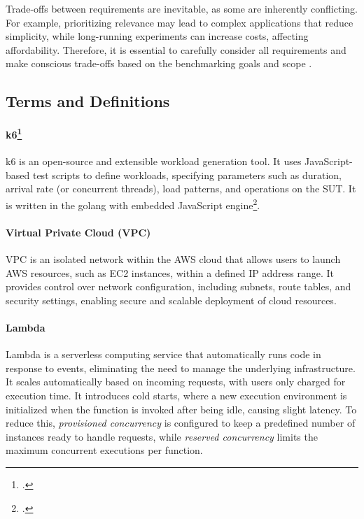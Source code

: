 Trade-offs between requirements are inevitable, as some are inherently conflicting. For example, prioritizing relevance may lead to complex applications that reduce simplicity, while long-running experiments can increase costs, affecting affordability. Therefore, it is essential to carefully consider all requirements and make conscious trade-offs based on the benchmarking goals and scope \cite{book_bermbach_cloud_service_benchmarking}.

\subsection{Terms and Definitions}
\label{challenges}

\paragraph{k6\footcite{https://k6.io/open-source/}}
k6 is an open-source and extensible workload generation tool. It uses JavaScript-based test scripts to define workloads, specifying parameters such as duration, arrival rate (or concurrent threads), load patterns, and operations on the SUT. It is written in the golang with embedded JavaScript engine\footcite{https://github.com/grafana/k6}.

\paragraph{Virtual Private Cloud (VPC)} VPC is an isolated network within the AWS cloud that allows users to launch AWS resources, such as EC2 instances, within a defined IP address range. It provides control over network configuration, including subnets, route tables, and security settings, enabling secure and scalable deployment of cloud resources.


\paragraph{Lambda}
Lambda is a serverless computing service that automatically runs code in response to events, eliminating the need to manage the underlying infrastructure. It scales automatically based on incoming requests, with users only charged for execution time. It introduces cold starts, where a new execution environment is initialized when the function is invoked after being idle, causing slight latency. To reduce this, \textit{provisioned concurrency} is configured to keep a predefined number of instances ready to handle requests, while \textit{reserved concurrency} limits the maximum concurrent executions per function.

